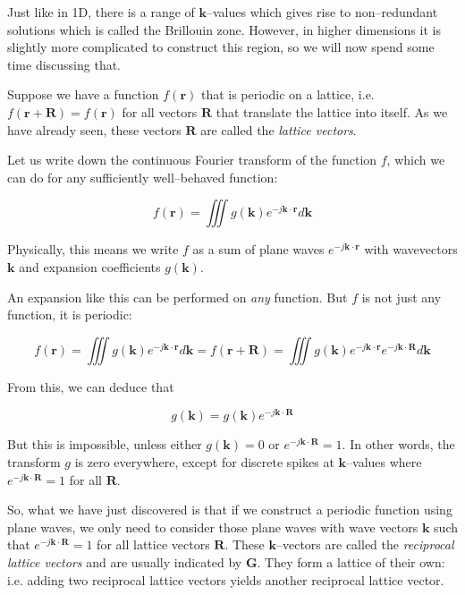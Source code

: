 Just like in 1D, there is a range of ${\mathbf k}$--values which gives rise to non--redundant solutions which is called the Brillouin zone. However, in higher dimensions it is slightly more complicated to construct this region, so we will now spend some time discussing that.

\pagebreak


Suppose we have a function $f({\mathbf r})$ that is periodic on a lattice, i.e. $f({\mathbf r} + {\mathbf R}) = f({\mathbf r})$ for all vectors ${\mathbf R}$ that translate the lattice into itself. As we have already seen, these vectors ${\mathbf R}$ are called the \emph{lattice vectors}.

Let us write down the continuous Fourier transform of the function $f$, which we can do for any sufficiently well--behaved function:

\begin{equation}
f({\mathbf r}) = \iiint g({\mathbf k}) e ^ {-j {\mathbf k} \cdot {\mathbf r}} d{\mathbf k}
\end{equation} 

Physically, this means we write $f$ as a sum of plane waves $e ^ {-j {\mathbf k} \cdot {\mathbf r}}$ with wavevectors ${\mathbf k}$ and expansion coefficients $g({\mathbf k})$.

An expansion like this can be performed on \emph{any} function. But $f$ is not just any function, it is periodic:

\begin{equation}
f({\mathbf r}) = \iiint g({\mathbf k}) e ^ {-j {\mathbf k} \cdot {\mathbf r}} d{\mathbf k} = f({\mathbf r} + {\mathbf R}) = \iiint g({\mathbf k}) e ^ {-j {\mathbf k} \cdot {\mathbf r}} e ^ {-j {\mathbf k} \cdot {\mathbf R}} d{\mathbf k}
\end{equation} 

From this, we can deduce that

\begin{equation}
g({\mathbf k}) = g({\mathbf k}) e ^ {-j {\mathbf k} \cdot {\mathbf R}}
\end{equation} 

But this is impossible, unless either $g({\mathbf k}) = 0$ or $e ^ {-j {\mathbf k} \cdot {\mathbf R}} = 1$. In other words, the transform $g$ is zero everywhere, except for discrete spikes at ${\mathbf k}$--values where $e ^ {-j {\mathbf k} \cdot {\mathbf R}} = 1$ for all ${\mathbf R}$.

So, what we have just discovered is that if we construct a periodic function using plane waves, we only need to consider those plane waves with wave vectors ${\mathbf k}$ such that $e ^ {-j {\mathbf k} \cdot {\mathbf R}} = 1$ for all lattice vectors ${\mathbf R}$. These ${\mathbf k}$--vectors are called the \emph{reciprocal lattice vectors} and are usually indicated by ${\mathbf G}$. They form a lattice of their own: i.e. adding two reciprocal lattice vectors yields another reciprocal lattice vector.

